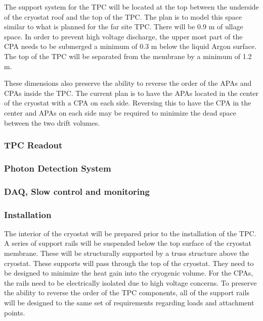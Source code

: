 The support system for the TPC will be located at the top between the underside of the cryostat roof and  the top of the TPC.  The plan is to model this space similar to what is planned for the far site TPC.  There will be 0.9 m of ullage space.  In order to prevent high voltage discharge, the upper most part of the CPA needs to be submerged a minimum of 0.3 m below the liquid Argon surface.  The top of the TPC will be separated from the membrane by a minimum of 1.2 m.  

These dimensions also preserve the ability to reverse the order of the APAs and CPAs inside the TPC.  The current plan is to have the APAs located in the center of the cryostat with a CPA on each side.  Reversing this to have the CPA in the center and APAs on each side may be required to minimize the dead space between the two drift volumes.    





\subsubsection{TPC Readout}



\subsubsection{Photon Detection System}


\subsubsection{DAQ, Slow control and monitoring}


\subsubsection{Installation}

The interior of the cryostat will be prepared prior to the installation of the TPC.  A series of support rails 
will be suspended below the top surface of the cryostat membrane.  These will be structurally supported 
by a truss structure above the cryostat.  These supports will pass through the top of the cryostat.  They 
need to be designed to minimize the heat gain into the cryogenic volume.  For the CPAs, the rails need to 
be electrically isolated due to high voltage concerns.  To preserve the ability to reverse the order of the 
TPC components, all of the support rails will be designed to the same set of requirements regarding 
loads and attachment points.  

